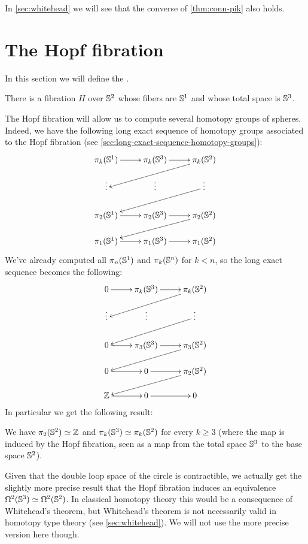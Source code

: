In \autoref{sec:whitehead} we will see that the converse of \autoref{thm:conn-pik} also holds.

%
%

\section{The Hopf fibration}
\label{sec:hopf}

In this section we will define the .
%

\begin{thm}
There is a fibration $H$ over $\mathbb{S} ^2$ whose fibers are $\mathbb{S} ^1$ and
whose total space is $\mathbb{S} ^3$.
\end{thm}

The Hopf fibration will allow us to compute several homotopy groups of
spheres.
Indeed, we have the following long exact sequence
of homotopy groups
associated to the Hopf fibration (see
\autoref{sec:long-exact-sequence-homotopy-groups}):
%
\[
\xymatrix@R=1.2pc{
  \pi_k(\Sn^1) \ar[r] & \pi_k(\Sn^3) \ar[r] & \pi_k(\Sn^2) \ar[lld] \\
  \vdots & \vdots & \vdots \ar[lld] \\
  \pi_2(\Sn^1) \ar[r] & \pi_2(\Sn^3) \ar[r] & \pi_2(\Sn^2) \ar[lld] \\
  \pi_1(\Sn^1) \ar[r] & \pi_1(\Sn^3) \ar[r] & \pi_1(\Sn^2)}
\]
%
We’ve already computed all $\pi_n(\mathbb{S}^1)$ and $\pi_k(\mathbb{S}^n)$ for $k<n$, so the
long exact sequence becomes the following:
%
\[
\xymatrix@R=1.2pc{
  0 \ar[r] & \pi_k(\Sn^3) \ar[r] & \pi_k(\Sn^2) \ar[lld] \\
  \vdots & \vdots & \vdots \ar[lld] \\
  0 \ar[r] & \pi_3(\Sn^3) \ar[r] & \pi_3(\Sn^2) \ar[lld] \\
  0 \ar[r] & 0 \ar[r] & \pi_2(\Sn^2) \ar[lld] \\
  \Z \ar[r] & 0 \ar[r] & 0}
\]
%
In particular we get the following result:

\begin{cor} \label{cor:pis2-hopf}
  We have $\pi_2(\mathbb{S}^2) \simeq \mathbb{Z}$ and $\pi_k(\mathbb{S}^3) \simeq \pi_k(\mathbb{S}^2)$ for
  every $k\ge3$ (where the map is induced by the Hopf fibration, seen as a map
  from the total space $\mathbb{S}^3$ to the base space $\mathbb{S}^2$).
\end{cor}

Given that the double loop space of the circle is contractible, we actually get
the slightly more precise result that the Hopf fibration induces an equivalence
$\Omega^2(\mathbb{S}^3) \simeq \Omega^2(\mathbb{S}^2)$. In classical homotopy theory this
would be a consequence of Whitehead's theorem, but Whitehead's theorem is not
necessarily valid in homotopy type theory (see \autoref{sec:whitehead}). We will not use the more precise
version here though.

